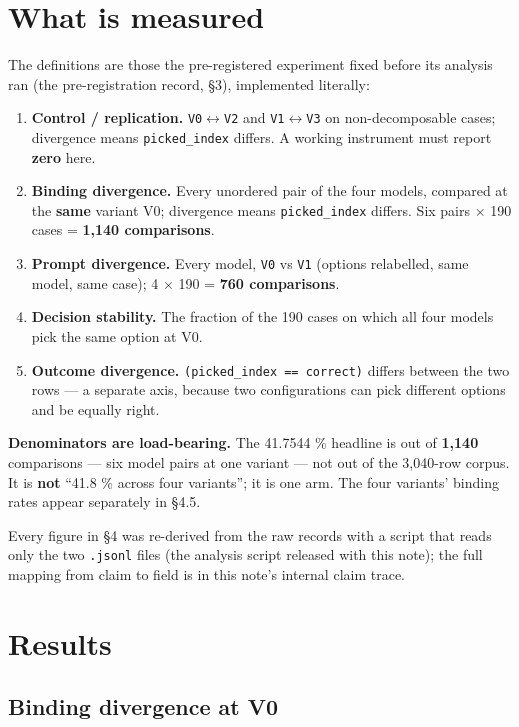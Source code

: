 \documentclass[11pt,a4paper]{article}
\begin{document}
\section{What is measured}

The definitions are those the pre-registered experiment fixed before its analysis ran (the pre-registration record, \S3), implemented literally:

\begin{enumerate}
\item \textbf{Control / replication.} \texttt{V0}$\leftrightarrow$\texttt{V2} and \texttt{V1}$\leftrightarrow$\texttt{V3} on non-decomposable cases; divergence means \texttt{picked\_index} differs. A working instrument must report \textbf{zero} here.
\item \textbf{Binding divergence.} Every unordered pair of the four models, compared at the \textbf{same} variant V0; divergence means \texttt{picked\_index} differs. Six pairs $\times$ 190 cases = \textbf{1,140 comparisons}.
\item \textbf{Prompt divergence.} Every model, \texttt{V0} vs \texttt{V1} (options relabelled, same model, same case); 4 $\times$ 190 = \textbf{760 comparisons}.
\item \textbf{Decision stability.} The fraction of the 190 cases on which all four models pick the same option at V0.
\item \textbf{Outcome divergence.} \texttt{(picked\_index == correct)} differs between the two rows --- a separate axis, because two configurations can pick different options and be equally right.
\end{enumerate}

\textbf{Denominators are load-bearing.} The 41.7544 \% headline is out of \textbf{1,140} comparisons --- six model pairs at one variant --- not out of the 3,040-row corpus. It is \textbf{not} ``41.8 \% across four variants''; it is one arm. The four variants' binding rates appear separately in \S4.5.

Every figure in \S4 was re-derived from the raw records with a script that reads only the two \texttt{.jsonl} files (the analysis script released with this note); the full mapping from claim to field is in this note's internal claim trace.

\section{Results}

\subsection{Binding divergence at V0}
\end{document}
